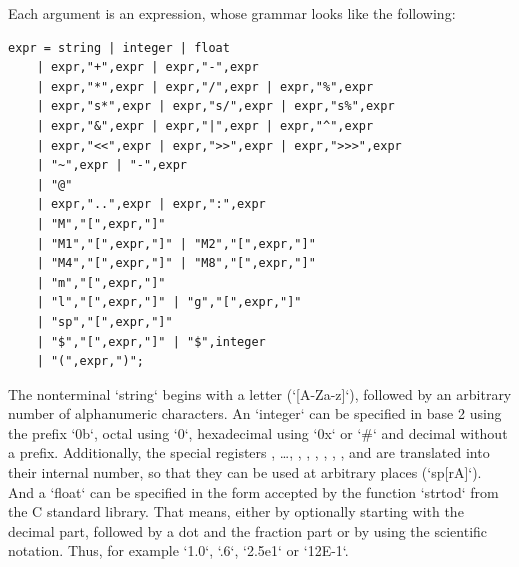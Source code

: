 Each argument is an expression, whose grammar looks like the following:
\begin{lstlisting}[caption=Grammar of expressions in \protect\gls{EBNF}]
expr = string | integer	| float
	| expr,"+",expr | expr,"-",expr
	| expr,"*",expr | expr,"/",expr | expr,"%",expr
	| expr,"s*",expr | expr,"s/",expr | expr,"s%",expr
	| expr,"&",expr | expr,"|",expr | expr,"^",expr
	| expr,"<<",expr | expr,">>",expr | expr,">>>",expr
	| "~",expr | "-",expr
	| "@"
	| expr,"..",expr | expr,":",expr
	| "M","[",expr,"]"
	| "M1","[",expr,"]" | "M2","[",expr,"]"
	| "M4","[",expr,"]" | "M8","[",expr,"]"
	| "m","[",expr,"]"
	| "l","[",expr,"]" | "g","[",expr,"]"
	| "sp","[",expr,"]"
	| "$","[",expr,"]" | "$",integer
	| "(",expr,")";
\end{lstlisting}
The nonterminal `string` begins with a letter (`[A-Za-z]`), followed by an arbitrary number of alphanumeric characters. An `integer` can be specified in base 2 using the prefix `0b`, octal using `0`, hexadecimal using `0x` or `#` and decimal without a prefix. Additionally, the special registers , \dots, , , , , , ,  and  are translated into their internal number, so that they can be used at arbitrary places (\eg `sp[rA]`). And a `float` can be specified in the form accepted by the function `strtod` from the C standard library. That means, either by optionally starting with the decimal part, followed by a dot and the fraction part or by using the scientific notation. Thus, for example `1.0`, `.6`, `2.5e1` or `12E-1`.

